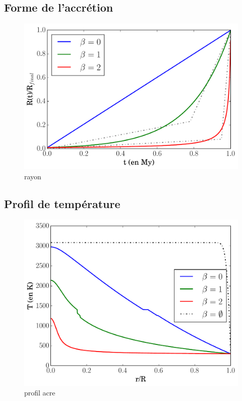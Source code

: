 \documentclass[10pt,a4paper]{article}
\numberwithin{equation}{section}
\begin{document}
\subsection{Forme de l'accrétion}

\begin{figure}[h]
    \centering	    
	\includegraphics[scale=0.5]{figures/rayon.pdf}
    \caption{rayon}
    	\label{rayon} 
\end{figure}

\subsection{Profil de température}

\begin{figure}[h]
    \centering	    
	\includegraphics[scale=0.5]{figures/profil_acre.pdf}
    \caption{profil acre}
    	\label{profilacre} 
\end{figure}
\end{document}
